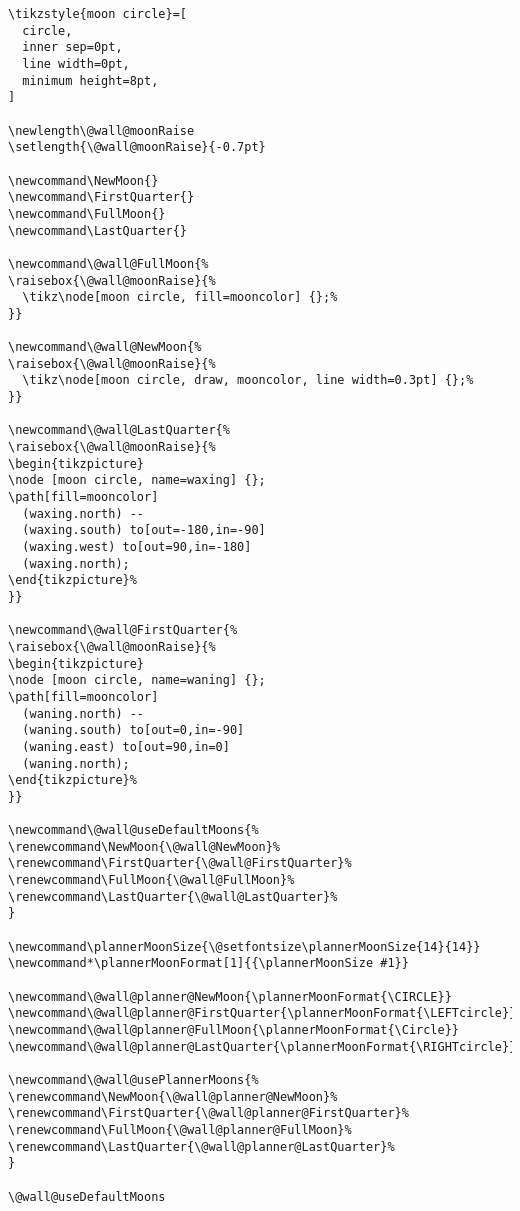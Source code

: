 \documentclass[11pt,oneside]{memoir-article}
\begin{document}
\begin{verbatim}
\tikzstyle{moon circle}=[
  circle,
  inner sep=0pt,
  line width=0pt,
  minimum height=8pt,
]

\newlength\@wall@moonRaise
\setlength{\@wall@moonRaise}{-0.7pt}

\newcommand\NewMoon{}
\newcommand\FirstQuarter{}
\newcommand\FullMoon{}
\newcommand\LastQuarter{}

\newcommand\@wall@FullMoon{%
\raisebox{\@wall@moonRaise}{%
  \tikz\node[moon circle, fill=mooncolor] {};%
}}

\newcommand\@wall@NewMoon{%
\raisebox{\@wall@moonRaise}{%
  \tikz\node[moon circle, draw, mooncolor, line width=0.3pt] {};%
}}

\newcommand\@wall@LastQuarter{%
\raisebox{\@wall@moonRaise}{%
\begin{tikzpicture}
\node [moon circle, name=waxing] {};
\path[fill=mooncolor]
  (waxing.north) --
  (waxing.south) to[out=-180,in=-90]
  (waxing.west) to[out=90,in=-180]
  (waxing.north);
\end{tikzpicture}%
}}

\newcommand\@wall@FirstQuarter{%
\raisebox{\@wall@moonRaise}{%
\begin{tikzpicture}
\node [moon circle, name=waning] {};
\path[fill=mooncolor]
  (waning.north) --
  (waning.south) to[out=0,in=-90]
  (waning.east) to[out=90,in=0]
  (waning.north);
\end{tikzpicture}%
}}

\newcommand\@wall@useDefaultMoons{%
\renewcommand\NewMoon{\@wall@NewMoon}%
\renewcommand\FirstQuarter{\@wall@FirstQuarter}%
\renewcommand\FullMoon{\@wall@FullMoon}%
\renewcommand\LastQuarter{\@wall@LastQuarter}%
}

\newcommand\plannerMoonSize{\@setfontsize\plannerMoonSize{14}{14}}
\newcommand*\plannerMoonFormat[1]{{\plannerMoonSize #1}}

\newcommand\@wall@planner@NewMoon{\plannerMoonFormat{\CIRCLE}}
\newcommand\@wall@planner@FirstQuarter{\plannerMoonFormat{\LEFTcircle}}
\newcommand\@wall@planner@FullMoon{\plannerMoonFormat{\Circle}}
\newcommand\@wall@planner@LastQuarter{\plannerMoonFormat{\RIGHTcircle}}

\newcommand\@wall@usePlannerMoons{%
\renewcommand\NewMoon{\@wall@planner@NewMoon}%
\renewcommand\FirstQuarter{\@wall@planner@FirstQuarter}%
\renewcommand\FullMoon{\@wall@planner@FullMoon}%
\renewcommand\LastQuarter{\@wall@planner@LastQuarter}%
}

\@wall@useDefaultMoons
\end{verbatim}
\end{document}
